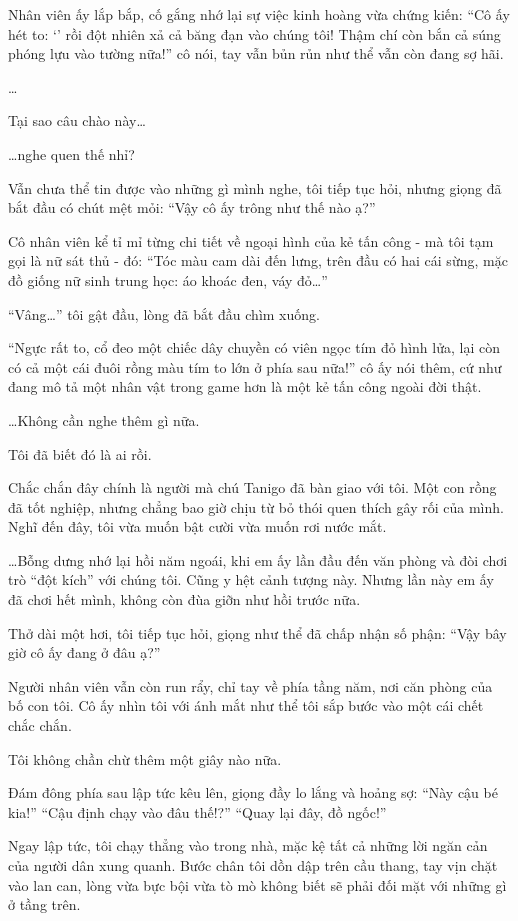 \documentclass[../main.tex]{subfiles}
\begin{document}
Nhân viên ấy lắp bắp, cố gắng nhớ lại sự việc kinh hoàng vừa chứng kiến: ``Cô ấy hét to: `' rồi đột nhiên xả cả băng đạn vào chúng tôi! Thậm chí còn bắn cả súng phóng lựu vào tường nữa!'' cô nói, tay vẫn bủn rủn như thể vẫn còn đang sợ hãi.

\dots

Tại sao câu chào này\dots

\dots nghe quen thế nhỉ?

Vẫn chưa thể tin được vào những gì mình nghe, tôi tiếp tục hỏi, nhưng giọng đã bắt đầu có chút mệt mỏi: ``Vậy cô ấy trông như thế nào ạ?''

Cô nhân viên kể tỉ mỉ từng chi tiết về ngoại hình của kẻ tấn công - mà tôi tạm gọi là nữ sát thủ - đó: ``Tóc màu cam dài đến lưng, trên đầu có hai cái sừng, mặc đồ giống nữ sinh trung học: áo khoác đen, váy đỏ\dots''

``Vâng\dots'' tôi gật đầu, lòng đã bắt đầu chìm xuống.

``Ngực rất to, cổ đeo một chiếc dây chuyền có viên ngọc tím đỏ hình lửa, lại còn có cả một cái đuôi rồng màu tím to lớn ở phía sau nữa!'' cô ấy nói thêm, cứ như đang mô tả một nhân vật trong game hơn là một kẻ tấn công ngoài đời thật.

\dots Không cần nghe thêm gì nữa.

Tôi đã biết đó là ai rồi.

Chắc chắn đây chính là người mà chú Tanigo đã bàn giao với tôi. Một con rồng đã tốt nghiệp, nhưng chẳng bao giờ chịu từ bỏ thói quen thích gây rối của mình. Nghĩ đến đây, tôi vừa muốn bật cười vừa muốn rơi nước mắt.

\dots Bỗng dưng nhớ lại hồi năm ngoái, khi em ấy lần đầu đến văn phòng và đòi chơi trò ``đột kích'' với chúng tôi. Cũng y hệt cảnh tượng này. Nhưng lần này em ấy đã chơi hết mình, không còn đùa giỡn như hồi trước nữa.

Thở dài một hơi, tôi tiếp tục hỏi, giọng như thể đã chấp nhận số phận: ``Vậy bây giờ cô ấy đang ở đâu ạ?''

Người nhân viên vẫn còn run rẩy, chỉ tay về phía tầng năm, nơi căn phòng của bố con tôi. Cô ấy nhìn tôi với ánh mắt như thể tôi sắp bước vào một cái chết chắc chắn.

Tôi không chần chừ thêm một giây nào nữa.

Đám đông phía sau lập tức kêu lên, giọng đầy lo lắng và hoảng sợ: ``Này cậu bé kia!'' ``Cậu định chạy vào đâu thế!?'' ``Quay lại đây, đồ ngốc!''

Ngay lập tức, tôi chạy thẳng vào trong nhà, mặc kệ tất cả những lời ngăn cản của người dân xung quanh. Bước chân tôi dồn dập trên cầu thang, tay vịn chặt vào lan can, lòng vừa bực bội vừa tò mò không biết sẽ phải đối mặt với những gì ở tầng trên.
\end{document}
